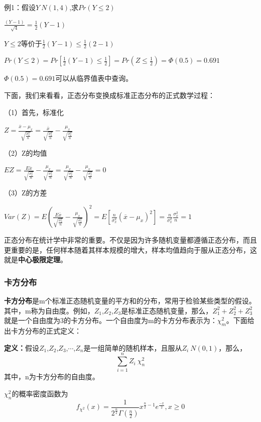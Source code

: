 \documentclass[cn,12pt,math=newtx,citestyle=gb7714-2015,bibstyle=gb7714-2015]{elegantbook}
\begin{document}
	例1：假设$Y~N(1,4)$,求$Pr(Y\le2)$
	
	$\frac{(Y-1)}{\sqrt{4}}=\frac{1}{2}(Y-1)$
	
	$Y\le2$等价于$\frac{1}{2}(Y-1)\le{\frac{1}{2}(2-1)}$
	
	$Pr(Y\le2)=Pr[\frac{1}{2}(Y-1)\le{\frac{1}{2}}]=Pr(Z\le{\frac{1}{2}})=\Phi(0.5)=0.691$
	
	$\Phi(0.5)=0.691$可以从临界值表中查询。
	
	下面，我们来看看，正态分布变换成标准正态分布的正式数学过程：
	
	（1）首先，标准化
	
	$Z=\frac{\overline{x}-\mu_x}{\sqrt{\frac{\sigma_x^2}{n}}}=\frac{\overline{x}}{\sqrt{\frac{\sigma_x^2}{n}}}-\frac{\mu_x}{\sqrt{\frac{\sigma_x^2}{n}}}$
	
	
	
	（2）Z的均值
	
	$EZ=\frac{E\overline{x}}{\sqrt{\frac{\sigma_{x}^{2}}{n}}}-\frac{\mu_x}{\sqrt{\frac{\sigma_{x}^{2}}{n}}}=\frac{\mu_x}{\sqrt{\frac{\sigma_{x}^{2}}{n}}}-\frac{\mu_x}{\sqrt{\frac{\sigma_{x}^{2}}{n}}}=0$
	
	
	
	（3）Z的方差
	
	$Var(Z)=E(\frac{E\overline{x}}{\sqrt{\frac{\sigma_{x}^{2}}{n}}}-\frac{\mu_x}{\sqrt{\frac{\sigma_{x}^{2}}{n}}})^2=E[\frac{n}{\sigma_x^2}(\overline{x}-\mu_x)^2]=\frac{n}{\sigma_x^2}\frac{\sigma_x^2}{n}=1$
	
	正态分布在统计学中非常的重要。不仅是因为许多随机变量都遵循正态分布，而且更重要的是，任何样本随着其样本规模的增大，样本均值趋向于服从正态分布，这就是\textbf{中心极限定理}。
	
	\subsubsection{卡方分布}
	\textbf{卡方分布}是m个标准正态随机变量的平方和的分布，常用于检验某些类型的假设。其中，m称为自由度。例如，$Z_1$,$Z_2$,$Z_3$是标准正态随机变量，那么，$Z_1^2+Z_2^2+Z_3^2$就是一个自由度为3的卡方分布。一个自由度为m的卡方分布表示为：$\chi_m^2$。下面给出卡方分布的正式定义：
	
	\textbf{定义：}假设$Z_1$,$Z_2$,$Z_3$,$\cdots$,$Z_n$是一组简单的随机样本，且服从$Z_i~N(0,1)$，那么，
	\begin{equation}
		\sum_{i=1}^n{Z_i}~\chi_n^2
	\end{equation}
	其中，n为卡方分布的自由度。
	
	$\chi_n^2$的概率密度函数为
	\begin{equation}
		f_{\chi^2}(x)=\frac{1}{2^{\frac{n}{2}}\Gamma(\frac{n}{2})}x^{\frac{n}{2}-1}e^{\frac{-x}{2}},x\geq0
	\end{equation}
	
\end{document}

